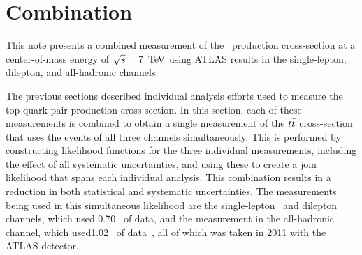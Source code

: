 
\section{Combination}


This note presents a combined measurement of the \ttbar\ production cross-section at a center-of-mass energy of $\sqrt{s}= 7\, \TeV$ using ATLAS results in the single-lepton, dilepton, and all-hadronic channels.

The previous sections described individual analysis efforts used to measure the top-quark pair-production cross-section.
In this section, each of these measurements is combined to obtain a single measurement of the $t\bar{t}$ cross-section 
that uses the events of all three channels simultaneously.
This is performed by constructing likelihood functions for the three individual measurements, including the effect of all
systematic uncertainties, and using these to create a join likelihood that spans each individual analysis.
This combination results in a reduction in both statistical and systematic uncertainties.
The measurements being used in this simultaneous likelihood are the single-lepton~\cite{lepjetsCONF} and dilepton~\cite{dileptCONF} channels,
which used 0.70 \ifb\ of data, and the measurement in the all-hadronic channel, 
which used1.02 \ifb\ of data~\cite{allhadCONF}, all of which was taken in 2011 with the ATLAS detector.


